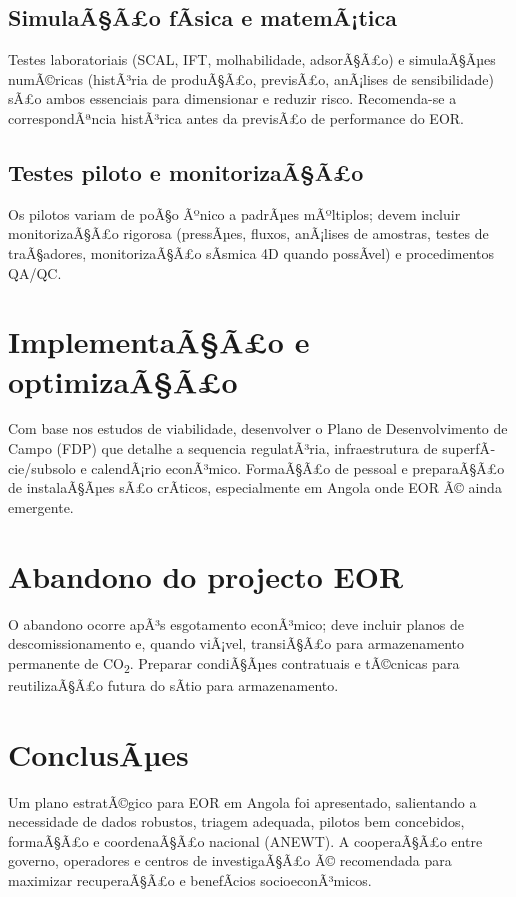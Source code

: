 \documentclass[11pt,a4paper]{article}
\begin{document}
\subsection{SimulaÃ§Ã£o fÃ­sica e matemÃ¡tica}
Testes laboratoriais (SCAL, IFT, molhabilidade, adsorÃ§Ã£o) e simulaÃ§Ãµes numÃ©ricas (histÃ³ria de produÃ§Ã£o, previsÃ£o, anÃ¡lises de sensibilidade) sÃ£o ambos essenciais para dimensionar e reduzir risco. Recomenda-se a correspondÃªncia histÃ³rica antes da previsÃ£o de performance do EOR.

\subsection{Testes piloto e monitorizaÃ§Ã£o}
Os pilotos variam de poÃ§o Ãºnico a padrÃµes mÃºltiplos; devem incluir monitorizaÃ§Ã£o rigorosa (pressÃµes, fluxos, anÃ¡lises de amostras, testes de traÃ§adores, monitorizaÃ§Ã£o sÃ­smica 4D quando possÃ­vel) e procedimentos QA/QC.

\section{ImplementaÃ§Ã£o e optimizaÃ§Ã£o}
Com base nos estudos de viabilidade, desenvolver o Plano de Desenvolvimento de Campo (FDP) que detalhe a sequencia regulatÃ³ria, infraestrutura de superfÃ­cie/subsolo e calendÃ¡rio econÃ³mico. FormaÃ§Ã£o de pessoal e preparaÃ§Ã£o de instalaÃ§Ãµes sÃ£o crÃ­ticos, especialmente em Angola onde EOR Ã© ainda emergente.

\section{Abandono do projecto EOR}
O abandono ocorre apÃ³s esgotamento econÃ³mico; deve incluir planos de descomissionamento e, quando viÃ¡vel, transiÃ§Ã£o para armazenamento permanente de CO\textsubscript{2}. Preparar condiÃ§Ãµes contratuais e tÃ©cnicas para reutilizaÃ§Ã£o futura do sÃ­tio para armazenamento.

\section{ConclusÃµes}
Um plano estratÃ©gico para EOR em Angola foi apresentado, salientando a necessidade de dados robustos, triagem adequada, pilotos bem concebidos, formaÃ§Ã£o e coordenaÃ§Ã£o nacional (ANEWT). A cooperaÃ§Ã£o entre governo, operadores e centros de investigaÃ§Ã£o Ã© recomendada para maximizar recuperaÃ§Ã£o e benefÃ­cios socioeconÃ³micos.
\end{document}
